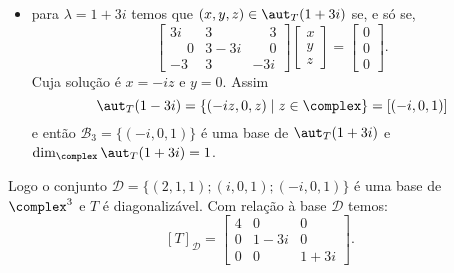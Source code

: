 \begin{exemplo}
\begin{enumerate}[label={\arabic*})]
\begin{solucao}
\begin{itemize}
                \item para $\lambda = 1 + 3i$ temos que $(x,y,z) \in \aut_T(1 + 3i)$ se, e s\'o se,
                \[
                    \begin{bmatrix}
                        3i & 3 & \phantom{-}3\\
                        \phantom{-}0 & 3 - 3i & \phantom{-}0\\
                        -3 & 3 & -3i
                    \end{bmatrix}\begin{bmatrix}
                        x\\y\\z
                    \end{bmatrix} = \begin{bmatrix}
                        0\\0\\0
                    \end{bmatrix}.
                \]
                Cuja solução é $x = -iz$ e $y = 0$. Assim
                \[
                    \aut_T(1 - 3i) = \{(-iz,0,z) \mid z \in \complex\} = [(-i,0,1)]
                \]
                e então $\mathcal{B}_3 = \{(-i,0,1)\}$ é uma base de $\aut_T(1 + 3i)$ e $\dim_\complex\aut_T(1 + 3i) = 1$.
            \end{itemize}

            Logo o conjunto $\mathcal{D} = \{(2, 1, 1); (i, 0, 1); (-i, 0, 1)\}$ é uma base de $\complex^3$ e $T$ é diagonalizável. Com relação à base $\mathcal{D}$ temos:
            \[
                [T]_\mathcal{D} = \begin{bmatrix}4 & 0 & 0\\0 & 1 - 3i & 0\\0 & 0 & 1 + 3i\end{bmatrix}.
            \]
            \end{solucao}


\end{enumerate}
\end{exemplo}
